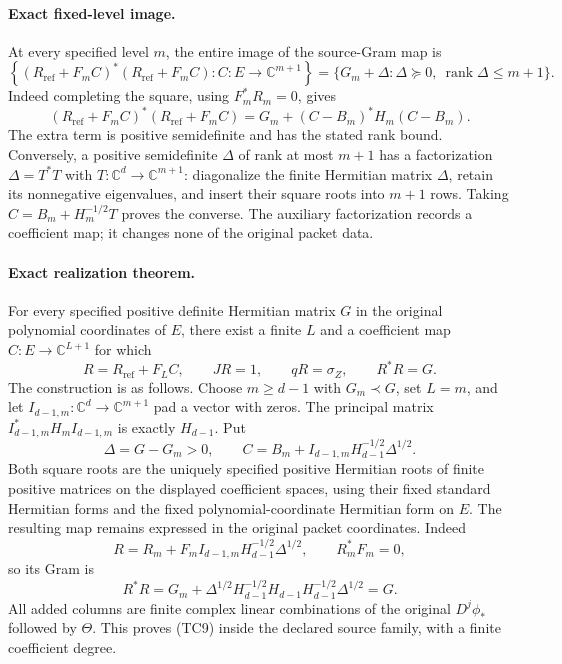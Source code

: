 \paragraph{Exact fixed-level image.}
At every specified level \(m\), the entire image of the source-Gram map is
\[
 \left\{(R_{\mathrm{ref}}+F_mC)^*(R_{\mathrm{ref}}+F_mC):C:E\to\mathbb C^{m+1}\right\}
 =\{G_m+\Delta:\Delta\succeq0,\ \operatorname{rank}\Delta\leq m+1\}.
 \tag{TC8a}
\]
Indeed completing the square, using \(F_m^*R_m=0\), gives
\[
 (R_{\mathrm{ref}}+F_mC)^*(R_{\mathrm{ref}}+F_mC)
      =G_m+(C-B_m)^*H_m(C-B_m).
 \tag{TC8b}
\]
The extra term is positive semidefinite and has the stated rank bound.
Conversely, a positive semidefinite \(\Delta\) of rank at most \(m+1\)
has a factorization \(\Delta=T^*T\) with
\(T:\mathbb C^d\to\mathbb C^{m+1}\): diagonalize the finite Hermitian
matrix \(\Delta\), retain its nonnegative eigenvalues, and insert their
square roots into \(m+1\) rows.  Taking
\(C=B_m+H_m^{-1/2}T\) proves the converse.  The auxiliary factorization
records a coefficient map; it changes none of the original packet data.

\paragraph{Exact realization theorem.}
For every specified positive definite Hermitian matrix \(G\) in the
original polynomial coordinates of \(E\), there exist a finite \(L\)
and a coefficient map \(C:E\to\mathbb C^{L+1}\) for which
\[
 R=R_{\mathrm{ref}}+F_LC,\qquad JR=1,\qquad qR=\sigma_Z,\qquad R^*R=G.
 \tag{TC9}
\]
The construction is as follows.  Choose \(m\geq d-1\) with
\(G_m\prec G\), set \(L=m\), and let
\(I_{d-1,m}:\mathbb C^d\to\mathbb C^{m+1}\) pad a vector with zeros.
The principal matrix \(I_{d-1,m}^*H_mI_{d-1,m}\) is exactly \(H_{d-1}\).
Put
\[
 \Delta=G-G_m>0,\qquad
 C=B_m+I_{d-1,m}H_{d-1}^{-1/2}\Delta^{1/2}.
 \tag{TC10}
\]
Both square roots are the uniquely specified positive Hermitian roots
of finite positive matrices on the displayed coefficient spaces, using
their fixed standard Hermitian forms and the fixed polynomial-coordinate
Hermitian form on \(E\).
The resulting map remains expressed in the original packet coordinates.
Indeed
\[
 R=R_m+F_mI_{d-1,m}H_{d-1}^{-1/2}\Delta^{1/2},\qquad
 R_m^*F_m=0,
\]
so its Gram is
\[
 R^*R=G_m+
 \Delta^{1/2}H_{d-1}^{-1/2}H_{d-1}H_{d-1}^{-1/2}\Delta^{1/2}=G.
\]
All added columns are finite complex linear combinations of the
original \(D^j\phi_*\) followed by \(\Theta\).  This proves (TC9)
inside the declared source family, with a finite coefficient degree.

